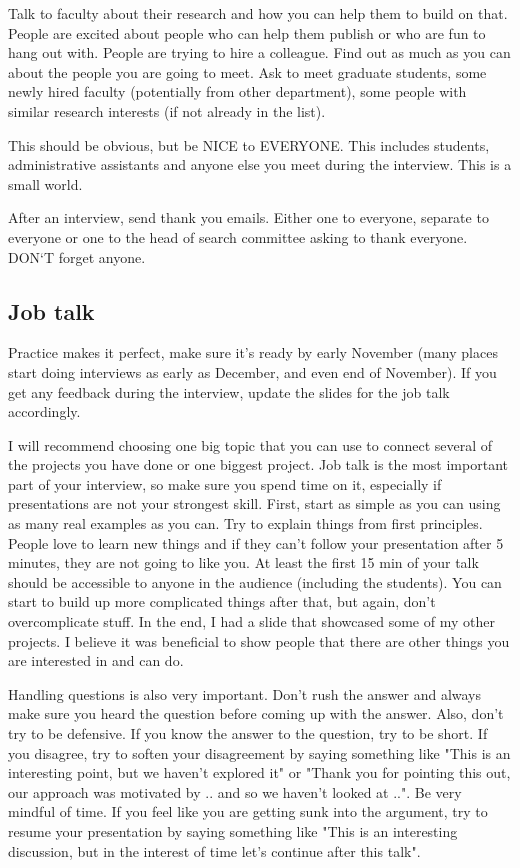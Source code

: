 \documentclass{article}
\begin{document}
Talk to faculty about their research and how you can help them to build on that. People are excited about people who can help them publish or who are fun to hang out with. People are trying to hire a colleague. Find out as much as you can about the people you are going to meet. Ask to meet graduate students, some newly hired faculty (potentially from other department), some people with similar research interests (if not already in the list).

This should be obvious, but be NICE to EVERYONE. This includes students, administrative assistants and anyone else you meet during the interview. This is a small world.

After an interview, send thank you emails. Either one to everyone, separate to everyone or one to the head of search committee asking to thank everyone. DON`T forget anyone.

\subsection{Job talk}

Practice makes it perfect, make sure it's ready by {\color{red} early } November (many places start doing interviews as early as December, {\color{red} and even end of November}). If you get any feedback during the interview, update the slides for the job talk accordingly.

I will recommend choosing one big topic that you can use to connect several of the projects you have done or one biggest project. Job talk is the most important part of your interview, so make sure you spend time on it, especially if presentations are not your strongest skill. First, start as simple as you can using as many real examples as you can. Try to explain things from first principles. People love to learn new things and if they can't follow your presentation after 5 minutes, they are not going to like you. At least the first 15 min of your talk should be accessible to anyone in the audience (including the students). You can start to build up more complicated things after that, but again, don't overcomplicate stuff. In the end, I had a slide that showcased some of my other projects. I believe it was beneficial to show people that there are other things you are interested in and can do.

Handling questions is also very important. Don't rush the answer and always make sure you heard the question before coming up with the answer. Also, don't try to be defensive. If you know the answer to the question, try to be short. If you disagree, try to soften your disagreement by saying something like "This is an interesting point, but we haven't explored it" or "Thank you for pointing this out, our approach was motivated by .. and so we haven't looked at ..". Be very mindful of time. If you feel like you are getting sunk into the argument, try to resume your presentation by saying something like "This is an interesting discussion, but in the interest of time let's continue after this talk". 
\end{document}
